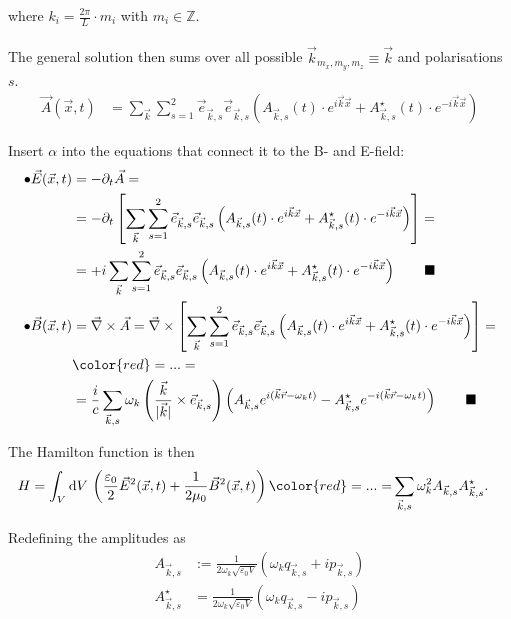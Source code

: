 \documentclass{article}
\newcommand{\diff}{\mathrm{d}}
\newcommand{\lr}[1]{\left(#1\right)}
\newcommand{\lreck}[1]{\left[#1\right]}
\begin{document}
{	where $k_i = \frac{2\pi}{L} \cdot m_i$ with $m_i \in \mathbb{Z}$.\\
	\\
	The general solution then sums over all possible $\vec{k}_{m_x,m_y,m_z} \equiv \vec{k}$ and polarisations $s$.
		\begin{align*}
			\vec{A}(\vec{x},t) &= \sum_{\vec{k}} \sum_{s=1}^2 \vec{e}_{\vec{k},s} \vec{e}_{\vec{k},s} \lr{ A_{\vec{k},s}(t) \cdot e^{i\vec{k}\vec{x}} + A_{\vec{k},s}^\star(t) \cdot e^{-i\vec{k}\vec{x}} }
		\end{align*}

	Insert $\alpha$ into the equations that connect it to the B- and E-field:
		\begin{align*}
			\bullet \vec{E}(\vec{x},t) &= -\partial_t \vec{A} = \\
			&= -\partial_t \lreck{ \sum_{\vec{k}} \sum_{s=1}^2 \vec{e}_{\vec{k},s} \vec{e}_{\vec{k},s} \lr{ A_{\vec{k},s}(t) \cdot e^{i\vec{k}\vec{x}} + A_{\vec{k},s}^\star(t) \cdot e^{-i\vec{k}\vec{x}} } } = \\
			&= +i \sum_{\vec{k}} \sum_{s=1}^2 \vec{e}_{\vec{k},s} \vec{e}_{\vec{k},s} \lr{ A_{\vec{k},s}(t) \cdot e^{i\vec{k}\vec{x}} + A_{\vec{k},s}^\star(t) \cdot e^{-i\vec{k}\vec{x}} } \qquad \blacksquare \\
			\bullet \vec{B}(\vec{x},t) &= \vec{\nabla} \times \vec{A} = \vec{\nabla} \times \lreck{ \sum_{\vec{k}} \sum_{s=1}^2 \vec{e}_{\vec{k},s} \vec{e}_{\vec{k},s} \lr{ A_{\vec{k},s}(t) \cdot e^{i\vec{k}\vec{x}} + A_{\vec{k},s}^\star(t) \cdot e^{-i\vec{k}\vec{x}} } } = \\
			&{\color{red}= ... = } \\
			&= \frac{i}{c} \sum_{\vec{k},s} \omega_k \lr{ \frac{\vec{k}}{|\vec{k}|} \times \vec{e}_{\vec{k},s} } \lr{ A_{\vec{k},s} e^{ i(\vec{k}\vec{r} - \omega_k t) } - A_{\vec{k},s}^\star e^{ -i(\vec{k}\vec{r} - \omega_k t) } } \qquad \blacksquare
		\end{align*}

	The Hamilton function is then
		\begin{align*}
			H &= \int_V \diff V \, \lr{ \frac{\varepsilon_0}{2} \vec{E}^2(\vec{x},t) + \frac{1}{2\mu_0} \vec{B}^2(\vec{x},t) } {\color{red}= ... =} \sum_{\vec{k},s} \omega_k^2 A_{\vec{k},s} A_{\vec{k},s}^\star.
		\end{align*}

	Redefining the amplitudes as
		\begin{align*}
			A_{\vec{k},s} &:= \frac{1}{2\omega_k \sqrt{\varepsilon_0 V}} (\omega_k q_{\vec{k},s} + ip_{\vec{k},s} ) \\
			A_{\vec{k},s}^\star &= \frac{1}{2\omega_k \sqrt{\varepsilon_0 V}} (\omega_k q_{\vec{k},s} - ip_{\vec{k},s} ) \\
		\end{align*}
	
}
\end{document}
